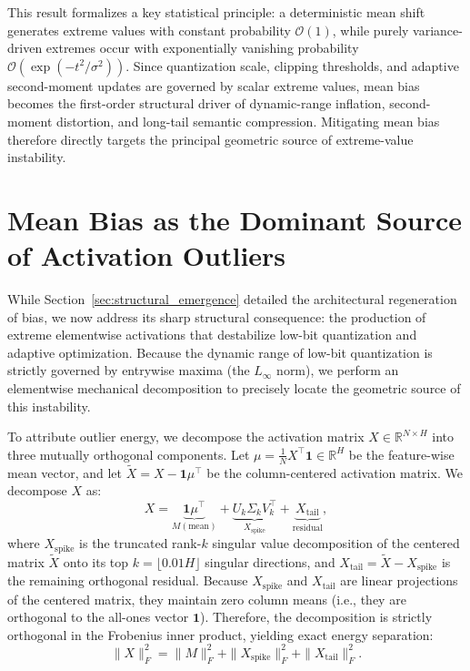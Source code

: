 This result formalizes a key statistical principle: a deterministic mean shift generates extreme values with constant probability $\mathcal{O}(1)$, while purely variance-driven extremes occur with exponentially vanishing probability $\mathcal{O}(\exp(-t^2/\sigma^2))$. Since quantization scale, clipping thresholds, and adaptive second-moment updates are governed by scalar extreme values, mean bias becomes the first-order structural driver of dynamic-range inflation, second-moment distortion, and long-tail semantic compression. Mitigating mean bias therefore directly targets the principal geometric source of extreme-value instability.


\section{Mean Bias as the Dominant Source of Activation Outliers}
\label{sec:activation_outliers}

While Section~\ref{sec:structural_emergence} detailed the architectural regeneration of bias, we now address its sharp structural consequence: the production of extreme elementwise activations that destabilize low-bit quantization and adaptive optimization. Because the dynamic range of low-bit quantization is strictly governed by entrywise maxima (the $L_\infty$ norm), we perform an elementwise mechanical decomposition to precisely locate the geometric source of this instability.

To attribute outlier energy, we decompose the activation matrix $X \in \mathbb{R}^{N \times H}$ into three mutually orthogonal components. Let $\mu = \frac{1}{N}X^\top \mathbf{1} \in \mathbb{R}^H$ be the feature-wise mean vector, and let $\tilde{X} = X - \mathbf{1}\mu^\top$ be the column-centered activation matrix. We decompose $X$ as:
\begin{equation}
X = \underbrace{\mathbf{1}\mu^\top}_{M (\text{mean})} + \underbrace{U_k \Sigma_k V_k^\top}_{X_{\text{spike}}} + \underbrace{X_{\text{tail}}}_{\text{residual}},
\end{equation}
where $X_{\text{spike}}$ is the truncated rank-$k$ singular value decomposition of the centered matrix $\tilde{X}$ onto its top $k = \lfloor 0.01 H \rfloor$ singular directions, and $X_{\text{tail}} = \tilde{X} - X_{\text{spike}}$ is the remaining orthogonal residual. Because $X_{\text{spike}}$ and $X_{\text{tail}}$ are linear projections of the centered matrix, they maintain zero column means (i.e., they are orthogonal to the all-ones vector $\mathbf{1}$). Therefore, the decomposition is strictly orthogonal in the Frobenius inner product, yielding exact energy separation:
\begin{equation}
\|X\|_F^2 = \|M\|_F^2 + \|X_{\text{spike}}\|_F^2 + \|X_{\text{tail}}\|_F^2.
\end{equation}

